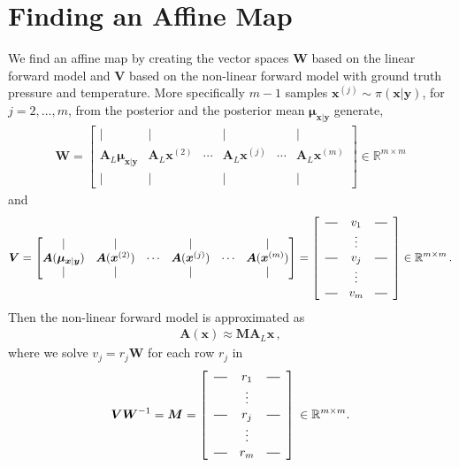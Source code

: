 \section{Finding an Affine Map}

We find an affine map by creating the vector spaces $\bm{W}$ based on the linear forward model and $\bm{V}$ based on the non-linear forward model with ground truth pressure and temperature.
More specifically $m-1$ samples $\bm{x}^{(j)} \sim \pi(\bm{x}|\bm{y})$, for $j = 2, \dots,m$, from the posterior and the posterior mean $\bm{\mu}_{\bm{x}|\bm{y}}$ generate,
\begin{align*}
	\bm{W} = \begin{bmatrix}
		\vert& \vert&   &  \vert & & \vert \\
		\bm{A}_{L}  \bm{\mu}_{\bm{x}|\bm{y}} & \bm{A}_{L}  \bm{x}^{(2)}   &  \cdots& \bm{A}_{L} \bm{x}^{(j)} &  \cdots & \bm{A}_{L} \bm{x}^{(m)} \\
		\vert& \vert&   &  \vert & & \vert 
	\end{bmatrix}
	\in \mathbb{R}^{m \times m}
\end{align*}\noindent and
\begin{align*}
	\bm{V} = \begin{bmatrix}
		\vert& \vert&   &  \vert & & \vert \\
		\bm{A}(\bm{\mu}_{\bm{x}|\bm{y}} ) & \bm{A}(\bm{x}^{(2)}) &  \cdots& \bm{A}(\bm{x}^{(j)}) &  \cdots & \bm{A} (\bm{x}^{(m)})  \\
		\vert&\vert&   &  \vert & & \vert 
	\end{bmatrix} = 
	\begin{bmatrix}
		\begin{array}{ccc}
			\horzbar & v_{1} & \horzbar \\
			& \vdots    &          \\
			\horzbar & v_{j} & \horzbar \\
			& \vdots    &          \\
			\horzbar &v_{m} & \horzbar
		\end{array}
	\end{bmatrix}\in \mathbb{R}^{m \times m} \, .
\end{align*}
Then the non-linear forward model is approximated as 
\begin{align}
	\bm{A}(\bm{x}) \approx \bm{M A}_L \bm{x} \, , \label{eq:AffineM}
\end{align}
where we solve $v_j =r_j \bm{W}$ for each row $r_j$ in
\begin{align*}
	\bm{V}\bm{W}^{-1} = \bm{M} =
	\begin{bmatrix}
		\begin{array}{ccc}
			\horzbar & r_{1} & \horzbar \\
			& \vdots    &          \\
			\horzbar & r_{j} & \horzbar \\
			& \vdots    &          \\
			\horzbar &r_{m} & \horzbar
		\end{array}
	\end{bmatrix}\, \in \mathbb{R}^{m \times m} .
\end{align*}
